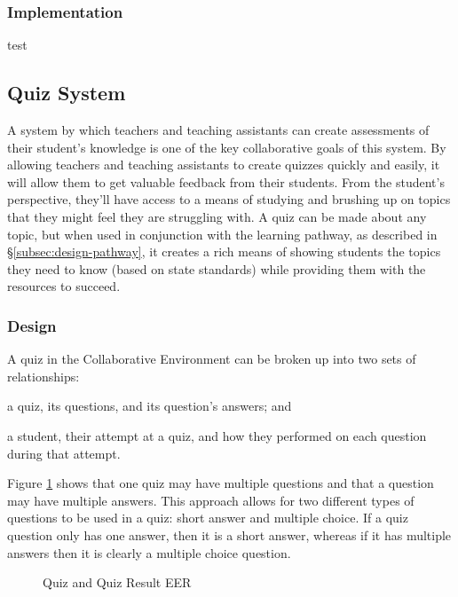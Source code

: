 \subsubsection{Implementation}
test

\subsection{Quiz System}
\label{subsec:design-quiz}
A system by which teachers and teaching assistants can create assessments of their student's knowledge is one of the key collaborative goals of this system. By allowing teachers and teaching assistants to create quizzes quickly and easily, it will allow them to get valuable feedback from their students. From the student's perspective, they'll have access to a means of studying and brushing up on topics that they might feel they are struggling with. A quiz can be made about any topic, but when used in conjunction with the learning pathway, as described in \S \ref{subsec:design-pathway}, it creates a rich means of showing students the topics they need to know (based on state standards) while providing them with the resources to succeed.

\subsubsection{Design}
A quiz in the Collaborative Environment can be broken up into two sets of relationships:
\begin{inparaenum}[\itshape 1\upshape)]
	\item a quiz, its questions, and its question's answers; and
	\item a student, their attempt at a quiz, and how they performed on each question during that attempt.
\end{inparaenum}
Figure \ref{fig:er-quiz} shows that one quiz may have multiple questions and that a question may have multiple answers. This approach allows for two different types of questions to be used in a quiz: short answer and multiple choice. If a quiz question only has one answer, then it is a short answer, whereas if it has multiple answers then it is clearly a multiple choice question.

\begin{figure}[h!]
	\centering
	\caption{Quiz and Quiz Result EER}
	\label{fig:er-quiz}
\end{figure}

